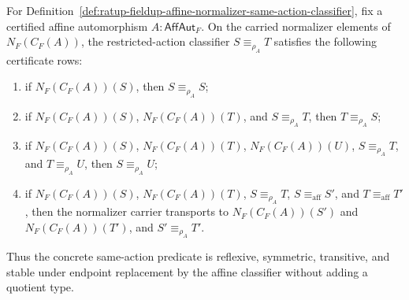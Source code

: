 \begin{theorem}
\label{thm:ratup-fieldup-affine-normalizer-same-action-classifier-stability}
For Definition~\ref{def:ratup-fieldup-affine-normalizer-same-action-classifier},
fix a certified affine automorphism $A:\mathsf{AffAut}_F$. On the carried
normalizer elements of $N_F(C_F(A))$, the restricted-action classifier
$S\equiv_{\rho_A}T$ satisfies the following certificate rows:
\begin{enumerate}
  \item if $N_F(C_F(A))(S)$, then $S\equiv_{\rho_A}S$;
  \item if $N_F(C_F(A))(S)$, $N_F(C_F(A))(T)$, and
  $S\equiv_{\rho_A}T$, then $T\equiv_{\rho_A}S$;
  \item if $N_F(C_F(A))(S)$, $N_F(C_F(A))(T)$, $N_F(C_F(A))(U)$,
  $S\equiv_{\rho_A}T$, and $T\equiv_{\rho_A}U$, then
  $S\equiv_{\rho_A}U$;
  \item if $N_F(C_F(A))(S)$, $N_F(C_F(A))(T)$,
  $S\equiv_{\rho_A}T$, $S\equiv_{\mathrm{aff}}S'$, and
  $T\equiv_{\mathrm{aff}}T'$, then the normalizer carrier transports to
  $N_F(C_F(A))(S')$ and $N_F(C_F(A))(T')$, and
  $S'\equiv_{\rho_A}T'$.
\end{enumerate}
Thus the concrete same-action predicate is reflexive, symmetric, transitive,
and stable under endpoint replacement by the affine classifier without adding a
quotient type.
\end{theorem}
